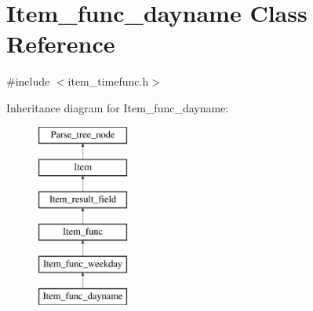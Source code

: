 \hypertarget{classItem__func__dayname}{}\section{Item\+\_\+func\+\_\+dayname Class Reference}
\label{classItem__func__dayname}


{\ttfamily \#include $<$item\+\_\+timefunc.\+h$>$}

Inheritance diagram for Item\+\_\+func\+\_\+dayname\+:\begin{figure}[H]
\begin{center}
\leavevmode
\includegraphics[height=6.000000cm]{classItem__func__dayname}
\end{center}
\end{figure}
